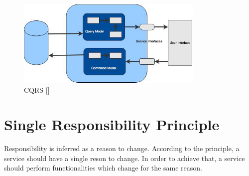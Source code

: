 \begin{figure}[H]
\begin{center}
\includegraphics[width=0.8\textwidth]{figures/Appendices_one_cqrs}
\caption{CQRS [\cite{Fowler:2011ab}]}
\label{fig:appendices/cqrs}
\end{center}
\end{figure}

\section{Single Responsibility Principle}\label{section:appendices/single_responsibility_principle}
Responsibility is inferred as a reason to change. According to the principle, a service should have a single reson to change. In order to achieve that, a service should perform functionalities which change for the same reason. \cite{Martin:2009aa} \cite{Stine:2014aa}